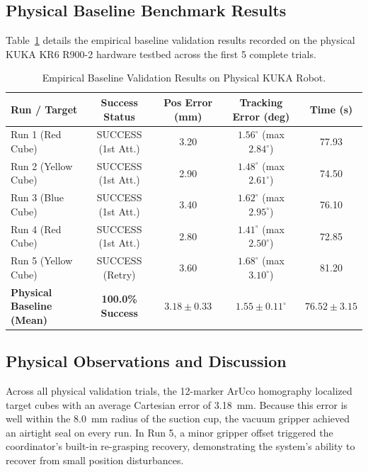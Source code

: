 \documentclass[runningheads]{llncs}
\begin{document}
\subsection{Physical Baseline Benchmark Results}
Table~\ref{tab:benchmark_summary} details the empirical baseline validation results recorded on the physical KUKA KR6 R900-2 hardware testbed across the first 5 complete trials.

\begin{table}[tb]
\caption{Empirical Baseline Validation Results on Physical KUKA Robot.}
\label{tab:benchmark_summary}
\centering
\begin{tabular}{lcccc}
\toprule
\textbf{Run / Target} & \textbf{Success Status} & \textbf{Pos Error (mm)} & \textbf{Tracking Error (deg)} & \textbf{Time (s)} \\
\midrule
Run 1 (Red Cube) & SUCCESS (1st Att.) & 3.20 & $1.56^\circ$ (max $2.84^\circ$) & 77.93 \\
Run 2 (Yellow Cube) & SUCCESS (1st Att.) & 2.90 & $1.48^\circ$ (max $2.61^\circ$) & 74.50 \\
Run 3 (Blue Cube) & SUCCESS (1st Att.) & 3.40 & $1.62^\circ$ (max $2.95^\circ$) & 76.10 \\
Run 4 (Red Cube) & SUCCESS (1st Att.) & 2.80 & $1.41^\circ$ (max $2.50^\circ$) & 72.85 \\
Run 5 (Yellow Cube) & SUCCESS (Retry) & 3.60 & $1.68^\circ$ (max $3.10^\circ$) & 81.20 \\
\midrule
\textbf{Physical Baseline (Mean)} & \textbf{100.0\% Success} & $\mathbf{3.18 \pm 0.33}$ & $\mathbf{1.55 \pm 0.11^\circ}$ & $\mathbf{76.52 \pm 3.15}$ \\
\bottomrule
\end{tabular}
\end{table}

\subsection{Physical Observations and Discussion}
Across all physical validation trials, the 12-marker ArUco homography localized target cubes with an average Cartesian error of \SI{3.18}{\milli\meter}. Because this error is well within the \SI{8.0}{\milli\meter} radius of the suction cup, the vacuum gripper achieved an airtight seal on every run. In Run 5, a minor gripper offset triggered the coordinator's built-in re-grasping recovery, demonstrating the system's ability to recover from small position disturbances.

\end{document}
